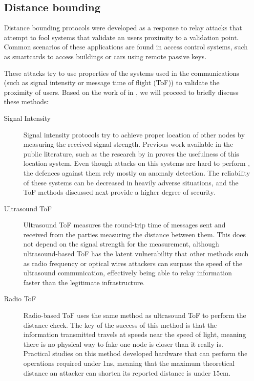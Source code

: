 \documentclass{article}
\begin{document}
\subsection{Distance bounding}

Distance bounding protocols were developed as a response to relay attacks that attempt to fool systems that validate an users proximity to a validation point. Common scenarios of these applications are found in access control systems, such as smartcards to access buildings or cars using remote passive keys.

These attacks try to use properties of the systems used in the communications (such as signal intensity or message time of flight (ToF)) to validate the proximity of users. Based on the work of \citeauthor{capkun2006secure} in \cite{capkun2006secure}, we will proceed to briefly discuss these methods:

\begin{description}
  \item[Signal Intensity] Signal intensity protocols try to achieve proper location of other nodes by measuring the received signal strength. Previous work available in the public literature, such as the research by \citeauthor{seshadri2005bayesian} in \cite{seshadri2005bayesian} proves the usefulness of this location system. Even though attacks on this systems are hard to perform \cite{sheng2008detecting}, the defences against them rely mostly on anomaly detection. The reliability of these systems can be decreased in heavily adverse situations, and the ToF methods discussed next provide a higher degree of security.
  \item[Ultrasound ToF] Ultrasound ToF measures the round-trip time of messages sent and received from the parties measuring the distance between them. This does not depend on the signal strength for the measurement, although ultrasound-based ToF has the latent vulnerability that other methods such as radio frequency or optical wires attackers can surpass the speed of the ultrasound communication, effectively being able to relay information faster than the legitimate infrastructure.
  \item[Radio ToF] Radio-based ToF uses the same method as ultrasound ToF to perform the distance check. The key of the success of this method is that the information transmitted travels at speeds near the speed of light, meaning there is no physical way to fake one node is closer than it really is. Practical studies on this method \cite{rasmussen2010realization} developed hardware that can perform the operations required under 1ns, meaning that the maximum theoretical distance an attacker can shorten its reported distance is under 15cm.
\end{description}
\end{document}

